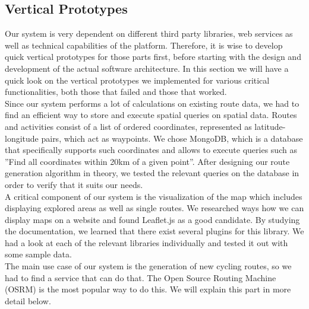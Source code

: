 \documentclass{sigchi}
\begin{document}
\subsection{Vertical Prototypes}
Our system is very dependent on different third party libraries, web services as well as technical capabilities of the platform. Therefore, it is wise to develop quick vertical prototypes for those parts first, before starting with the design and development of the actual software architecture. In this section we will have a quick look on the vertical prototypes we implemented for various critical functionalities, both those that failed and those that worked.\\
Since our system performs a lot of calculations on existing route data, we had to find an efficient way to store and execute spatial queries on spatial data. Routes and activities consist of a list of ordered coordinates, represented as latitude-longitude pairs, which act as waypoints. We chose MongoDB, which is a database that specifically supports such coordinates and allows to execute queries such as ''Find all coordinates within 20km of a given point''. After designing our route generation algorithm in theory, we tested the relevant queries on the database in order to verify that it suits our needs. \\
A critical component of our system is the visualization of the map which includes displaying explored areas as well as single routes. We researched ways how we can display maps on a website and found Leaflet.js as a good candidate. By studying the documentation, we learned that there exist several plugins for this library. We had a look at each of the relevant libraries individually and tested it out with some sample data.\\
The main use case of our system is the generation of new cycling routes, so we had to find a service that can do that. The Open Source Routing Machine (OSRM) is the most popular way to do this. We will explain this part in more detail below.
\end{document}
